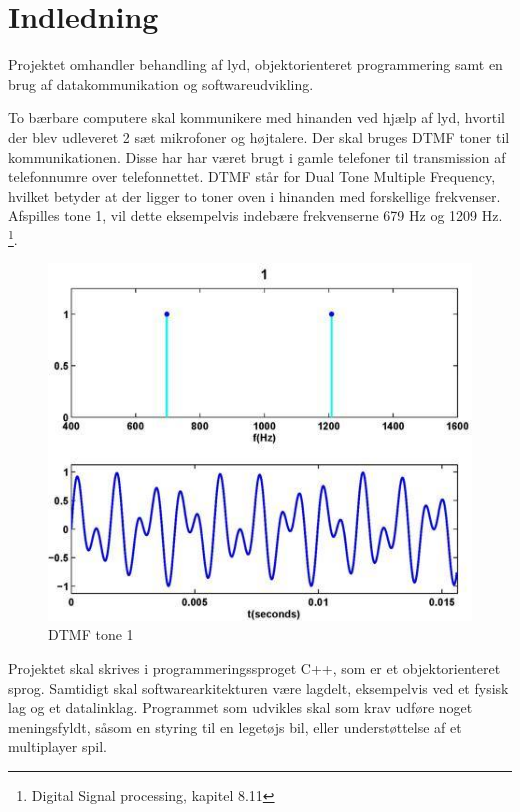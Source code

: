 \section{Indledning}
Projektet omhandler behandling af lyd, objektorienteret programmering samt en brug af datakommunikation og softwareudvikling.

To bærbare computere skal kommunikere med hinanden ved hjælp af lyd, hvortil der blev udleveret 2 sæt mikrofoner og højtalere.
Der skal bruges DTMF toner til kommunikationen. Disse har har været brugt i gamle telefoner til transmission af telefonnumre over telefonnettet. DTMF står for Dual Tone Multiple Frequency, hvilket betyder at der ligger to toner oven i hinanden med forskellige frekvenser. Afspilles tone 1, vil dette eksempelvis indebære frekvenserne 679 Hz og 1209 Hz. \footnote{Digital Signal processing, kapitel 8.11}.

\begin{figure}[h]
\centering
\includegraphics[scale=0.5]{Billeder/DTMF1.JPG}
\caption{DTMF tone 1}
\label{fig:DTMF1}
\end{figure}

Projektet skal skrives i programmeringssproget C++, som er et objektorienteret sprog. Samtidigt skal softwarearkitekturen være lagdelt, eksempelvis ved et fysisk lag og et datalinklag.
Programmet som udvikles skal som krav udføre noget meningsfyldt, såsom en styring til en legetøjs bil, eller understøttelse af et multiplayer spil.  